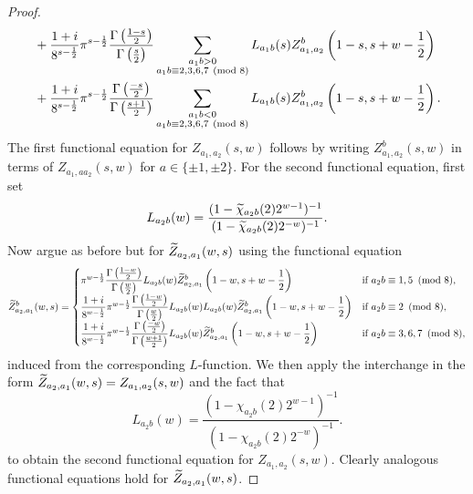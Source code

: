 \begin{proof}
\begin{align*}
            &+\frac{1+i}{8^{s-\frac{1}{2}}}\pi^{s-\frac{1}{2}}\frac{\Gamma\left(\frac{1-s}{2}\right)}{\Gamma\left(\frac{s}{2}\right)}\sum_{\substack{a_{1}b > 0 \\ a_{1}b \equiv 2,3,6,7 \ \left(\text{mod }8\right)}}L_{a_{1}b}(s)Z_{a_{1},a_{2}}^{b}\left(1-s,s+w-\frac{1}{2}\right) \\
            &+\frac{1+i}{8^{s-\frac{1}{2}}}\pi^{s-\frac{1}{2}}\frac{\Gamma\left(\frac{-s}{2}\right)}{\Gamma\left(\frac{s+1}{2}\right)}\sum_{\substack{a_{1}b < 0 \\ a_{1}b \equiv 2,3,6,7 \ \left(\text{mod }8\right)}}L_{a_{1}b}(s)Z_{a_{1},a_{2}}^{b}\left(1-s,s+w-\frac{1}{2}\right).
        \end{align*}
        The first functional equation for $Z_{a_{1},a_{2}}(s,w)$ follows by writing $Z_{a_{1},a_{2}}^{b}(s,w)$ in terms of $Z_{a_{1},aa_{2}}(s,w)$ for $a \in \{\pm1,\pm2\}$. For the second functional equation, first set
        \[
            L_{a_{2}b}(w) = \frac{(1-\widetilde{\chi}_{a_{2}b}(2)2^{w-1})^{-1}}{(1-\widetilde{\chi}_{a_{2}b}(2)2^{-w})^{-1}}.
        \]
        Now argue as before but for $\widetilde{Z}_{a_{2},a_{1}}(w,s)$ using the functional equation
        \[
            \widetilde{Z}_{a_{2},a_{1}}^{b}(w,s) = \begin{cases} \pi^{w-\frac{1}{2}}\dfrac{\Gamma\left(\frac{1-w}{2}\right)}{\Gamma\left(\frac{w}{2}\right)}L_{a_{2}b}(w)\widetilde{Z}_{a_{2},a_{1}}^{b}\left(1-w,s+w-\dfrac{1}{2}\right) & \text{if $a_{2}b \equiv 1,5 \ \left(\text{mod }8\right)$}, \\ \dfrac{1+i}{8^{w-\frac{1}{2}}}\pi^{w-\frac{1}{2}}\dfrac{\Gamma\left(\frac{1-w}{2}\right)}{\Gamma\left(\frac{w}{2}\right)}L_{a_{2}b}(w)L_{a_{2}b}(w)\widetilde{Z}_{a_{2},a_{1}}^{b}\left(1-w,s+w-\dfrac{1}{2}\right) & \text{if $a_{2}b \equiv 2 \ \left(\text{mod }8\right)$}, \\ \dfrac{1+i}{8^{w-\frac{1}{2}}}\pi^{w-\frac{1}{2}}\dfrac{\Gamma\left(\frac{-w}{2}\right)}{\Gamma\left(\frac{w+1}{2}\right)}L_{a_{2}b}(w)\widetilde{Z}_{a_{2},a_{1}}^{b}\left(1-w,s+w-\dfrac{1}{2}\right) & \text{if $a_{2}b \equiv 3,6,7 \ \left(\text{mod }8\right)$},\end{cases}
        \]
        induced from the corresponding $L$-function. We then apply the interchange in the form $\widetilde{Z}_{a_{2},a_{1}}(w,s) = Z_{a_{1},a_{2}}(s,w)$ and the fact that
        \[
            L_{a_{2}b}(w) = \frac{(1-\chi_{a_{2}b}(2)2^{w-1})^{-1}}{(1-\chi_{a_{2}b}(2)2^{-w})^{-1}}.
        \]
        to obtain the second functional equation for $Z_{a_{1},a_{2}}(s,w)$. Clearly analogous functional equations hold for $\widetilde{Z}_{a_{2},a_{1}}(w,s)$.
    \end{proof}

